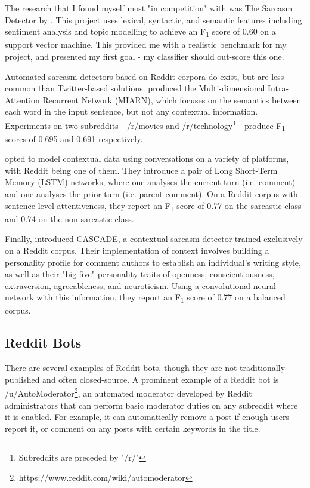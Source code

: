 \documentclass[a4paper,12pt]{article}
\begin{document}
The research that I found myself most "in competition" with was The Sarcasm Detector by \cite{clicheSarcasmDetector2014}. This project uses lexical, syntactic, and semantic features including sentiment analysis and topic modelling to achieve an F\textsubscript{1} score of 0.60 on a support vector machine. This provided me with a realistic benchmark for my project, and presented my first goal - my classifier should out-score this one.

Automated sarcasm detectors based on Reddit corpora do exist, but are less common than Twitter-based solutions. \cite{tayReasoningSarcasmReading2018} produced the Multi-dimensional Intra-Attention Recurrent Network (MIARN), which focuses on the semantics between each word in the input sentence, but not any contextual information. Experiments on two subreddits - /r/movies and /r/technology\footnote{Subreddits are preceded by "/r/"} - produce F\textsubscript{1} scores of 0.695 and 0.691 respectively.

\cite{ghoshSarcasmAnalysisUsing2018} opted to model contextual data using conversations on a variety of platforms, with Reddit being one of them. They introduce a pair of Long Short-Term Memory (LSTM) networks, where one analyses the current turn (i.e. comment) and one analyses the prior turn (i.e. parent comment). On a Reddit corpus with sentence-level attentiveness, they report an F\textsubscript{1} score of 0.77 on the sarcastic class and 0.74 on the non-sarcastic class.

Finally, \cite{hazarikaCASCADEContextualSarcasm2018} introduced CASCADE, a contextual sarcasm detector trained exclusively on a Reddit corpus. Their implementation of context involves building a personality profile for comment authors to establish an individual's writing style, as well as their "big five" personality traits of openness, conscientiousness, extraversion, agreeableness, and neuroticism. Using a convolutional neural network with this information, they report an F\textsubscript{1} score of 0.77 on a balanced corpus.

\subsection{Reddit Bots}
There are several examples of Reddit bots, though they are not traditionally published and often closed-source. A prominent example of a Reddit bot is /u/AutoModerator\footnote{https://www.reddit.com/wiki/automoderator}, an automated moderator developed by Reddit administrators that can perform basic moderator duties on any subreddit where it is enabled. For example, it can automatically remove a post if enough users report it, or comment on any posts with certain keywords in the title.
\end{document}
